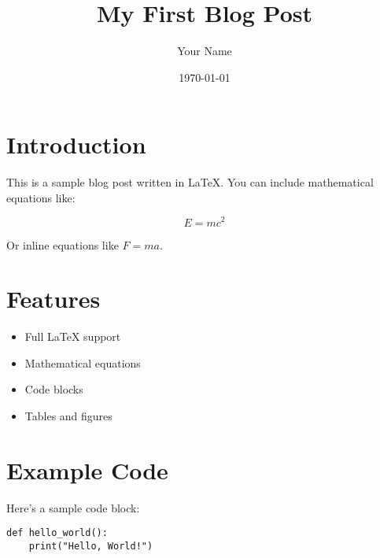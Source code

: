 \documentclass{article}
\title{My First Blog Post}
\author{Your Name}
\date{\today}
\begin{document}
\maketitle

\section{Introduction}
This is a sample blog post written in \LaTeX. You can include mathematical equations like:

\[E = mc^2\]

Or inline equations like $F = ma$.

\section{Features}
\begin{itemize}
    \item Full LaTeX support
    \item Mathematical equations
    \item Code blocks
    \item Tables and figures
\end{itemize}

\section{Example Code}
Here's a sample code block:

\begin{verbatim}
def hello_world():
    print("Hello, World!")
\end{verbatim}
\end{document}
